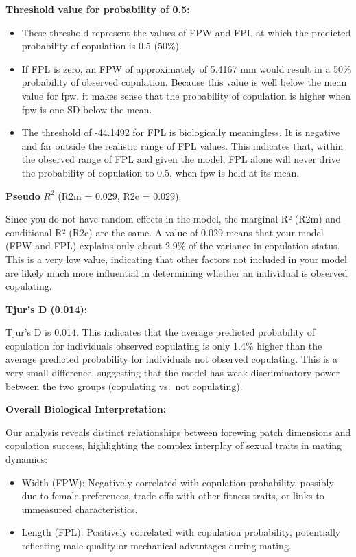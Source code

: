 \documentclass[
]{article}
\providecommand{\tightlist}{%
  \setlength{\itemsep}{0pt}\setlength{\parskip}{0pt}}
\begin{document}
\textbf{Threshold value for probability of 0.5:}

\begin{itemize}
\tightlist
\item
  These threshold represent the values of FPW and FPL at which the
  predicted probability of copulation is 0.5 (50\%).
\item
  If FPL is zero, an FPW of approximately of 5.4167 mm would result in a
  50\% probability of observed copulation. Because this value is well
  below the mean value for fpw, it makes sense that the probability of
  copulation is higher when fpw is one SD below the mean.
\item
  The threshold of -44.1492 for FPL is biologically meaningless. It is
  negative and far outside the realistic range of FPL values. This
  indicates that, within the observed range of FPL and given the model,
  FPL alone will never drive the probability of copulation to 0.5, when
  fpw is held at its mean.
\end{itemize}

\textbf{Pseudo} \(R^2\) (R2m = 0.029, R2c = 0.029):

Since you do not have random effects in the model, the marginal R² (R2m)
and conditional R² (R2c) are the same. A value of 0.029 means that your
model (FPW and FPL) explains only about 2.9\% of the variance in
copulation status. This is a very low value, indicating that other
factors not included in your model are likely much more influential in
determining whether an individual is observed copulating.

\textbf{Tjur's D (0.014):}

Tjur's D is 0.014. This indicates that the average predicted probability
of copulation for individuals observed copulating is only 1.4\% higher
than the average predicted probability for individuals not observed
copulating. This is a very small difference, suggesting that the model
has weak discriminatory power between the two groups (copulating vs.~not
copulating).

\textbf{Overall Biological Interpretation:}

Our analysis reveals distinct relationships between forewing patch
dimensions and copulation success, highlighting the complex interplay of
sexual traits in mating dynamics:

\begin{itemize}
\tightlist
\item
  Width (FPW): Negatively correlated with copulation probability,
  possibly due to female preferences, trade-offs with other fitness
  traits, or links to unmeasured characteristics.
\item
  Length (FPL): Positively correlated with copulation probability,
  potentially reflecting male quality or mechanical advantages during
  mating.
\end{itemize}
\end{document}
